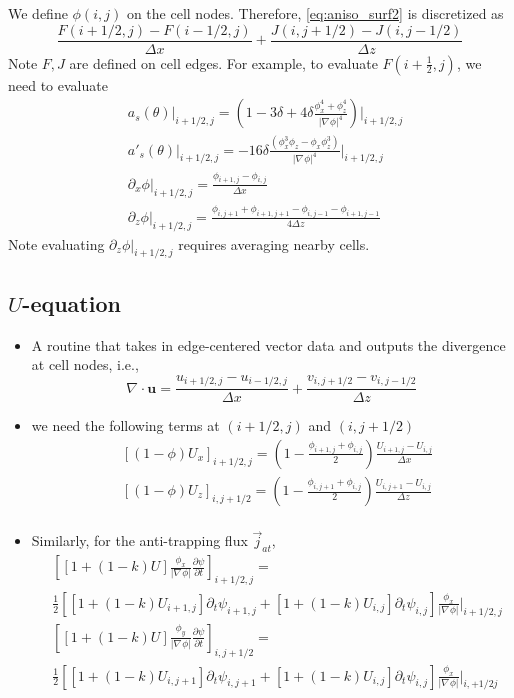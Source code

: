 \documentclass[a4paper,12pt]{article}
\newcommand{\B}[1]{\mathbf{#1}}
\renewcommand{\div}[1]{\nabla_{#1} \cdot}
\newcommand{\grad}[1]{\nabla_{#1}}
\begin{document}
We define $\phi(i,j)$ on the cell nodes. Therefore, \cref{eq:aniso_surf2} is discretized as
\begin{equation}
\frac{F(i+1/2, j) - F(i-1/2,j)}{\Delta x} + \frac{J(i,j+1/2)-J(i,j-1/2)}{\Delta z}
\end{equation}
Note $F,J$ are defined on cell edges. For example, to evaluate $F(i+\frac{1}{2},j)$, we need to evaluate
\begin{align}
& a_s(\theta) \bigg|_{i+1/2,j} = \left( 1-3\delta + 4\delta  \frac{\phi_x^4 +  \phi_z^4}{|\grad{} \phi|^4} \right)\bigg|_{i+1/2,j} \\
& a'_s(\theta) \bigg|_{i+1/2,j} = -16\delta  \frac{(\phi_x^3 \phi_z- \phi_x \phi_z^3 )}{|\grad{} \phi|^4} \bigg|_{i+1/2,j}\\
& \partial_x \phi \bigg|_{i+1/2,j} = \frac{\phi_{i+1,j}-\phi_{i,j}}{\Delta x} \\
& \partial_z \phi \bigg|_{i+1/2,j}  = \frac{\phi_{i,j+1}+\phi_{i+1,j+1}-\phi_{i,j-1}-\phi_{i+1,j-1}}{4\Delta z} 
\end{align}
Note evaluating $\partial_z \phi |_{i+1/2,j}$ requires averaging nearby cells. 


\subsection{$U$-equation}
\begin{itemize}
\item A routine that takes in edge-centered vector data and outputs the divergence at cell nodes, i.e.,
\begin{equation}
\div{} \B{u} = \frac{u_{i+1/2,j} - u_{i-1/2,j}}{\Delta x} +  \frac{v_{i, j+1/2} - v_{i,j-1/2}}{\Delta z}
\end{equation}

\item we need the following terms at $(i+1/2,j)$ and $(i,j+1/2)$
\begin{align}
& [(1-\phi) U_x]_{i+1/2,j} = \left( 1- \frac{\phi_{i+1,j} + \phi_{i,j}}{2} \right) \frac{U_{i+1,j}-U_{i,j}}{\Delta x}\\
& [(1-\phi) U_z]_{i,j+1/2} = \left( 1- \frac{\phi_{i,j+1} + \phi_{i,j}}{2} \right) \frac{U_{i,j+1}-U_{i,j}}{\Delta z}\\
\end{align}

\item Similarly, for the anti-trapping flux $\vec{j}_{at}$,
\begin{align}
& \left[ [1+(1-k)U]  \frac{\phi_x}{ |\grad{} \phi | } \frac{\partial \psi}{\partial t}  \right]_{i+1/2,j} = \nonumber \\
&  \frac{1}{2}\left[[1+(1-k)U_{i+1,j}]\partial_t\psi_{i+1,j}+[1+(1-k)U_{i,j}]\partial_t\psi_{i,j}\right]  \frac{\phi_x}{ |\grad{} \phi | }\bigg|_{i+1/2,j}  \\
& \left[ [1+(1-k)U]  \frac{\phi_y}{ |\grad{} \phi | } \frac{\partial \psi}{\partial t}  \right]_{i,j+1/2} = \nonumber \\ 
& \frac{1}{2}\left[[1+(1-k)U_{i,j+1}]\partial_t\psi_{i,j+1}+[1+(1-k)U_{i,j}]\partial_t\psi_{i,j}\right]  \frac{\phi_x}{ |\grad{} \phi | }\bigg|_{i,+1/2j}  
\end{align}
\end{itemize}
\end{document}

